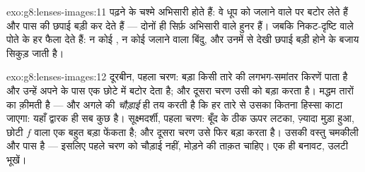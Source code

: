 \begin{solution}{exo:g8:lenses-images:11}
पढ़ने के चश्मे अभिसारी होते हैं: वे धूप को जलाने वाले  पर बटोर लेते
हैं और पास की छपाई बड़ी कर देते हैं --- दोनों ही सिर्फ़ अभिसारी वाले
हुनर हैं। जबकि निकट-दृष्टि वाले पोते के  हर  फैला
देते हैं: न कोई , न कोई जलाने वाला बिंदु, और उनमें से देखी छपाई
बड़ी होने के बजाय सिकुड़ जाती है।
\end{solution}

\begin{solution}{exo:g8:lenses-images:12}
दूरबीन, पहला चरण: बड़ा  किसी तारे की लगभग-समांतर किरणें पाता है और
उन्हें अपने  के पास एक छोटे  में बटोर देता है;
और दूसरा चरण उसी  को बड़ा करता है। मद्धम तारों का 
क़ीमती है --- और अगले  की \emph{चौड़ाई} ही तय करती है कि हर तारे
से उसका कितना हिस्सा काटा जाएगा: यहाँ द्वारक ही सब कुछ है।
सूक्ष्मदर्शी, पहला चरण: बूँद के ठीक ऊपर लटका, ज़्यादा मुड़ा हुआ, छोटी
$f$ वाला  एक बहुत बड़ा  फेंकता है; और दूसरा चरण
उसे फिर बड़ा करता है। उसकी वस्तु चमकीली और पास है --- इसलिए पहले चरण को
चौड़ाई नहीं, मोड़ने की ताक़त चाहिए। एक ही बनावट, उलटी भूखें।
\end{solution}

